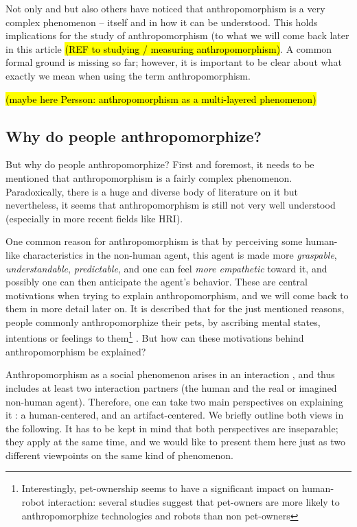 \documentclass{frontiersSCNS} %
\begin{document}
Not only \cite{epley_when_2008} and \cite{duffy_anthropomorphism_2002} but also others have noticed that anthropomorphism is a very complex phenomenon -- itself and in how it can be understood. This holds implications for the study of anthropomorphism (to what we will come back later in this article \hl{(REF to studying / measuring anthropomorphism)}.
A common formal ground is missing so far; however, it is important to be clear about what exactly we mean when using the term anthropomorphism.

\hl{(maybe here Persson: anthropomorphism as a multi-layered phenomenon)}


%
%
%
%
%
%

\subsection{Why do people anthropomorphize?}
\label{sec:explanations}

But why do people anthropomorphize? First and foremost, it needs to be mentioned that anthropomorphism is a fairly complex phenomenon. Paradoxically, there is a huge and diverse body of literature on it but nevertheless, it seems that anthropomorphism is still not very well understood (especially in more recent fields like HRI).

One common reason for anthropomorphism is that by perceiving some human-like characteristics in the non-human agent, this agent is made more \emph{graspable}, \emph{understandable}, \emph{predictable}, and one can feel \emph{more empathetic} toward it, and possibly one can then anticipate the agent's behavior. These are central motivations when trying to explain anthropomorphism, and we will come back to them in more detail later on. 
It is described that for the just mentioned reasons, people commonly anthropomorphize their pets, by ascribing mental states, intentions or feelings to them\footnote{Interestingly, pet-ownership seems to have a significant impact on human-robot interaction: several studies suggest that pet-owners are more likely to anthropomorphize technologies and robots than non pet-owners} \cite{eddy_attribution_1993}. But how can these motivations behind anthropomorphism be explained?

Anthropomorphism as a social phenomenon arises in an interaction \citep{persson_anthropomorphism_2000}, and thus includes at least two interaction partners (the human and the real or imagined non-human agent). Therefore, one can take two main perspectives on explaining it \citep{lee_human_2005}: a human-centered, and an artifact-centered. We briefly outline both views in the following. It has to be kept in mind that both perspectives are inseparable; they apply at the same time, and we would like to present them here just as two different viewpoints on the same kind of phenomenon.
\end{document}

